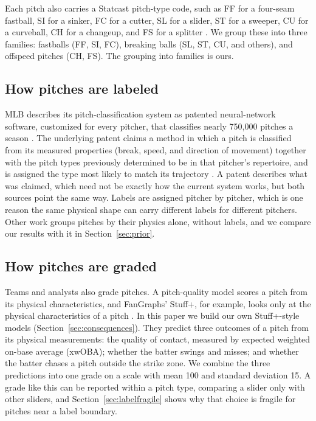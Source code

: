 \documentclass{article}
\theoremstyle{definition}
\theoremstyle{remark}
\begin{document}
Each pitch also carries a Statcast pitch-type code, such as FF for a four-seam fastball, SI for a sinker, FC for a cutter, SL for a slider, ST for a sweeper, CU for a curveball, CH for a changeup, and FS for a splitter \parencite{mlbglossary_pitchtypes}.
We group these into three families: fastballs (FF, SI, FC), breaking balls (SL, ST, CU, and others), and offspeed pitches (CH, FS). The grouping into families is ours.

\subsection{How pitches are labeled}\label{sec:labels}
MLB describes its pitch-classification system as patented neural-network software, customized for every pitcher, that classifies nearly 750{,}000 pitches a season \parencite{sharpe2020classification}.
The underlying patent claims a method in which a pitch is classified from its measured properties (break, speed, and direction of movement) together with the pitch types previously determined to be in that pitcher's repertoire, and is assigned the type most likely to match its trajectory \parencite{paul2014patent}.
A patent describes what was claimed, which need not be exactly how the current system works, but both sources point the same way.
Labels are assigned pitcher by pitcher, which is one reason the same physical shape can carry different labels for different pitchers.
Other work groups pitches by their physics alone, without labels, and we compare our results with it in Section~\ref{sec:prior}.

\subsection{How pitches are graded}\label{sec:grading}
Teams and analysts also grade pitches.
A pitch-quality model scores a pitch from its physical characteristics, and FanGraphs' Stuff+, for example, looks only at the physical characteristics of a pitch \parencite{mcgrattan2023stuffplus}.
In this paper we build our own Stuff+-style models (Section~\ref{sec:consequences}).
They predict three outcomes of a pitch from its physical measurements: the quality of contact, measured by expected weighted on-base average (xwOBA); whether the batter swings and misses; and whether the batter chases a pitch outside the strike zone.
We combine the three predictions into one grade on a scale with mean 100 and standard deviation 15.
A grade like this can be reported within a pitch type, comparing a slider only with other sliders, and Section~\ref{sec:labelfragile} shows why that choice is fragile for pitches near a label boundary.
\end{document}
